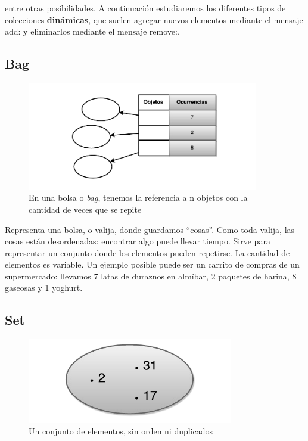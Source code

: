 \documentclass[a4paper,12pt]{book}
\begin{document}
entre otras posibilidades. A continuación estudiaremos los diferentes tipos de colecciones \textbf{dinámicas}, que
suelen agregar nuevos elementos mediante el mensaje add: y eliminarlos mediante el mensaje remove:.

\subsection{Bag}

\begin{figure}[h!]
    \centering
    \includegraphics[width=0.9\textwidth]{images/40_Bag.pdf}
    \caption{En una bolsa o \textit{bag}, tenemos la referencia a n objetos con la cantidad de veces que se repite}
\end{figure}
\FloatBarrier

Representa una bolsa, o valija, donde guardamos ``cosas''. Como toda valija, las cosas están desordenadas: 
encontrar algo puede llevar tiempo. Sirve para representar un conjunto donde los elementos pueden 
repetirse. La cantidad de elementos es variable. Un ejemplo posible puede ser un carrito de compras 
de un supermercado: llevamos 7 latas de duraznos en almíbar, 2 paquetes de harina, 8 gaseosas y 1 yoghurt. 

\subsection{Set}

\begin{figure}[h!]
    \centering
    \includegraphics[width=0.8\textwidth]{images/40_Set.pdf}
    \caption{Un conjunto de elementos, sin orden ni duplicados}
\end{figure}
\FloatBarrier
\end{document}
